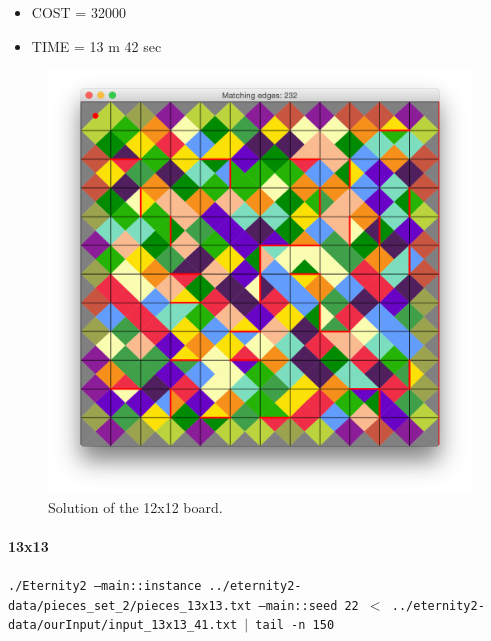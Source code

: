 	\begin{itemize}
		\item COST = 32000
		\item TIME = 13 m 42 sec
	\end{itemize}
	\begin{figure}[H]
	\centering
	\includegraphics[scale=0.25]{img/sol_12x12}
	\caption{Solution of the 12x12 board.}
	\end{figure}



	\paragraph{13x13}
	\texttt{./Eternity2 --main::instance ../eternity2-data/pieces\_set\_2/pieces\_13x13.txt --main::seed 22 $<$ ../eternity2-data/ourInput/input\_13x13\_41.txt $\mid$ tail -n 150}

